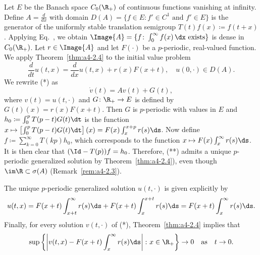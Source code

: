 \begin{example}\label{ex:a4-2.5}
Let $E$ be the Banach space $C_{0}(\R_{+})$ of continuous functions vanishing at infinity.
Define  $A = \frac{d}{dx}$ with domain $D(A) = \{f \in E: f' \in C^{1} \text{ and } f' \in E\}$ is the generator of the uniformly stable translation semigroup $T(t)f(x) \coloneqq f(t+x)$. 
Applying Eq.~, we obtain $\Image{A} = \{f\colon\int_{0}^{\infty} f(x) \,\dx \text{ exists}\}$ is dense in $C_{0}(\R_{+})$. 
Let $r \in \Image{A}$ and let $F(\cdot)$ be a $p$-periodic, real-valued function.
We apply Theorem~\ref{thm:a4-2.4}  to the initial value problem
\begin{equation}
 \frac{d}{dt} u(t,x) = \frac{d}{dx}u(t,x) + r(x)F(x+t), \quad u(0,\cdot) \in D(A). 
 \tag{*}
\end{equation}
We rewrite (*) as  
\begin{equation}
\dot{v}(t) = Av(t) + G(t), \tag{**}
\end{equation}
where $v(t) = u(t,\cdot)$ and $G\colon\R_{+} \to E$ is defined by $G(t)(x) = r(x)F(x+t)$.
Then $G$ is $p$-periodic with values in $E$ and $h_{0} \coloneqq \int_{0}^{p} T(p-t)G(t)  \dt$ is the function $x \mapsto \left[\int_{0}^{p} T(p-t)G(t)  \dt\right](x) = F(x)\int_{x}^{x+p} r(s)  \ds$. 
Now define $f \coloneqq  \sum_{k=0}^{\infty} T(kp)h_{0}$, which corresponds to the function $x \mapsto F(x)\int_{x}^{\infty} r(s)  \ds$. It is then clear that $(\Id - T(p))f = h_{0}$. 
Therefore, (**) admits a unique $p$-periodic generalized solution by Theorem~\ref{thm:a4-2.4}), even though $\im \R \subset \sigma(A)$ (\cf Remark~\ref{rem:a4-2.3}).

The unique $p$-periodic generalized solution $u(t,\cdot)$ is given explicitly by 
\[
u(t,x) = F(x+t)\int_{x+t}^{\infty} r(s) \ds + F(x+t)\int_{x}^{x+t} r(s) \ds = F(x+t)\int_{x}^{\infty} r(s) \ds.
\]
Finally, for every solution $v(t,\cdot)$ of (*), Theorem~\ref{thm:a4-2.4} implies that
\[
\sup\left\{\left|v(t,x) - F(x+t)\int_{x}^{\infty} r(s)  \ds\right| \colon x \in \R_{+}\right\} \to 0 \quad \text{as} \quad t \to 0.
\]
\end{example}
